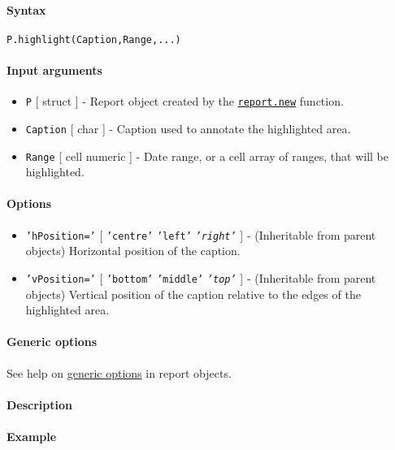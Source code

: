 


	\paragraph{Syntax}

\begin{verbatim}
P.highlight(Caption,Range,...)
\end{verbatim}

\paragraph{Input arguments}

\begin{itemize}
\item
  \texttt{P} {[} struct {]} - Report object created by the
  \href{report/new}{\texttt{report.new}} function.
\item
  \texttt{Caption} {[} char {]} - Caption used to annotate the
  highlighted area.
\item
  \texttt{Range} {[} cell \textbar{} numeric {]} - Date range, or a cell
  array of ranges, that will be highlighted.
\end{itemize}

\paragraph{Options}

\begin{itemize}
\item
  \texttt{'hPosition='} {[} \texttt{'centre'} \textbar{} \texttt{'left'}
  \textbar{} \emph{\texttt{'right'}} {]} - (Inheritable from parent
  objects) Horizontal position of the caption.
\item
  \texttt{'vPosition='} {[} \texttt{'bottom'} \textbar{}
  \texttt{'middle'} \textbar{} \emph{\texttt{'top'}} {]} - (Inheritable
  from parent objects) Vertical position of the caption relative to the
  edges of the highlighted area.
\end{itemize}

\paragraph{Generic options}

See help on \href{report/Contents}{generic options} in report objects.

\paragraph{Description}

\paragraph{Example}



